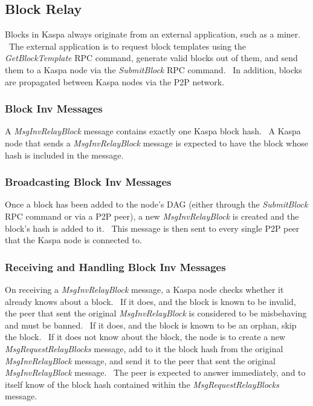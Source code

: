 \subsection{Block Relay}
\label{part2:kaspad:p2p:block_relay}
Blocks in Kaspa always originate from an external application, such as a miner. \
The external application is to request block templates using the \textit{GetBlockTemplate} RPC command, generate valid blocks out of them, and send them to a Kaspa node via the \textit{SubmitBlock} RPC command. \
In addition, blocks are propagated between Kaspa nodes via the P2P network.

\subsubsection{Block Inv Messages}
\label{part2:kaspad:p2p:block_relay:block_invs}

A \textit{MsgInvRelayBlock} message contains exactly one Kaspa block hash. \
A Kaspa node that sends a \textit{MsgInvRelayBlock} message is expected to have the block whose hash is included in the message.


\subsubsection{Broadcasting Block Inv Messages}
\label{part2:kaspad:p2p:block_relay:broadcast_block_invs}

Once a block has been added to the node's DAG (either through the \textit{SubmitBlock} RPC command or via a P2P peer), a new \textit{MsgInvRelayBlock} is created and the block's hash is added to it. \
This message is then sent to every single P2P peer that the Kaspa node is connected to.


\subsubsection{Receiving and Handling Block Inv Messages}
\label{part2:kaspad:p2p:block_relay:receive_block_invs}

On receiving a \textit{MsgInvRelayBlock} message, a Kaspa node checks whether it already knows about a block. \
If it does, and the block is known to be invalid, the peer that sent the original \textit{MsgInvRelayBlock} is considered to be misbehaving and must be banned. \
If it does, and the block is known to be an orphan, skip the block. \
If it does not know about the block, the node is to create a new \textit{MsgRequestRelayBlocks} message, add to it the block hash from the original \textit{MsgInvRelayBlock} message, and send it to the peer that sent the original \textit{MsgInvRelayBlock} message. \
The peer is expected to answer immediately, and to itself know of the block hash contained within the \textit{MsgRequestRelayBlocks} message.

